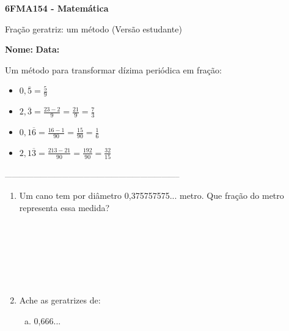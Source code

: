 \documentclass[a4paper,14pt]{article}
\begin{document}
	
	\noindent\textbf{6FMA154 - Matemática} 
	
	\begin{center}Fração geratriz: um método (Versão estudante)
	\end{center}
	
	\noindent\textbf{Nome:} \underline{\hspace{10cm}}
	\noindent\textbf{Data:} \underline{\hspace{4cm}}
	
	
	\begin{multicols}{2}
	    \noindent Um método para transformar dízima periódica em fração: \\
	    \begin{itemize}
	    	\item $0,\overline{5} = \frac{5}{9}$
	    	\item $2,\overline{3} = \frac{23 - 2}{9} = \frac{21}{9} = \frac{7}{3}$
	    	\item $0,1\overline{6} = \frac{16 - 1}{90} = \frac{15}{90} = \frac{1}{6}$
	    	\item $2,1\overline{3} = \frac{213 - 21}{90} = \frac{192}{90} = \frac{32}{15}$
	    \end{itemize}
		\noindent\textsubscript{--------------------------------------------------------------------------}
		\begin{enumerate} 
			\item Um cano tem por diâmetro 0,375757575... metro. Que fração do metro representa essa medida? \\\\\\\\\\\\\\
			\item Ache as geratrizes de:
			\begin{enumerate}[a)]
				\item 0,666... \\\\\\\\\\\\\\\\

\end{enumerate}
\end{enumerate}
\end{multicols}
\end{document}
